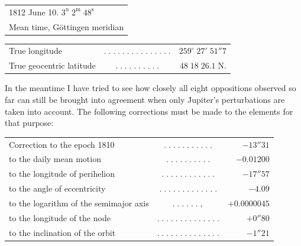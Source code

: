 \begin{center}\fontsize{10}{12}\selectfont\setlength{\tabcolsep}{0pt}\renewcommand{\arraystretch}{1.15}\begin{tabular}{l}
1812 June 10. $3^{\mathrm u}\;2^{\mathrm m}\;48^{\mathrm s}$\\Mean time, Göttingen meridian
\end{tabular}\end{center}
\begin{center}\fontsize{10}{12}\selectfont\setlength{\tabcolsep}{2pt}\renewcommand{\arraystretch}{1.15}\begin{tabular}{lcr}
True longitude & $.\;.\;.\;.\;.\;.\;.\;.\;.\;.\;.\;.\;.\;.\;.$ & $259^\circ\;27'\;51''7$\\
True geocentric latitude & $.\;.\;.\;.\;.\;.\;.\;.\;.\;.$ & $48\;18\;26.1\;\mathrm{N}.$\\
\end{tabular}\end{center}

\par\indent In the meantime I have tried to see how closely all eight oppositions observed so far can still be brought into agreement when only Jupiter’s perturbations are taken into account. The following corrections must be made to the elements for that purpose:

\begin{center}\fontsize{9}{11}\selectfont\setlength{\tabcolsep}{2pt}\renewcommand{\arraystretch}{1.15}\begin{tabular}{lcr}
Correction to the epoch 1810 & $.\;.\;.\;.\;.\;.\;.\;.\;.\;.\;.$ & $-13''31$\\
to the daily mean motion & $.\;.\;.\;.\;.\;.\;.\;.\;.\;.$ & $-0.01200$\\
to the longitude of perihelion & $.\;.\;.\;.\;.\;.\;.\;.\;.\;.\;.\;.$ & $-17''57$\\
to the angle of eccentricity & $.\;.\;.\;.\;.\;.\;.\;.\;.\;.\;.\;.\;.$ & $-4.09$\\
to the logarithm of the semimajor axis & $.\;.\;.\;.\;.\;.\;,$ & $+0.0000045$\\
to the longitude of the node & $.\;.\;.\;.\;.\;.\;.\;.\;.\;.\;.\;.\;.\;.$ & $+0''80$\\
to the inclination of the orbit & $.\;.\;.\;.\;.\;.\;.\;.\;.\;.\;.\;.\;.\;.$ & $-1''21$\\
\end{tabular}\end{center}

